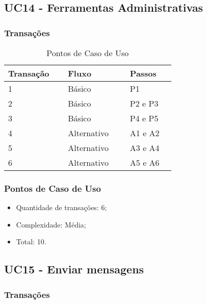 \subsection{UC14 - Ferramentas Administrativas}

\subsubsection{Transações}

\begin{table*}[!h]
\centering
\caption{Pontos de Caso de Uso}
\label{Rotulo}
  \begin{tabular}{|p{0.20\linewidth}|p{0.25\linewidth}|p{0.20\linewidth}|}
  \hline
  \textbf{Transação} & \textbf{Fluxo} & \textbf{Passos} \\ 
  \hline
  1 & Básico & P1\\
  \hline
  2 & Básico & P2 e P3\\
  \hline
  3 & Básico & P4 e P5\\
  \hline
  4 & Alternativo & A1 e A2\\
  \hline
  5 & Alternativo & A3 e A4\\
  \hline
  6 & Alternativo & A5 e A6\\
  \hline
  \end{tabular}
\end{table*}

\pagebreak
\subsubsection{Pontos de Caso de Uso}

\begin{itemize}
 \item Quantidade de transações: 6;
 \item Complexidade: Média;
 \item Total: 10.
\end{itemize}

\vfill

\subsection{UC15 - Enviar mensagens}

\subsubsection{Transações}

